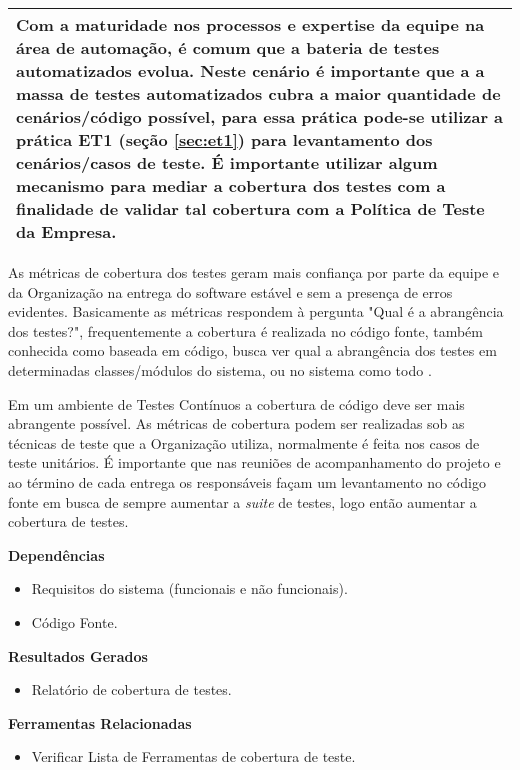 \begin{table}[H]
\centering
\begin{tabular}{|p{130mm}|}
\hline
Com a maturidade nos processos e expertise da equipe na área de automação, é comum que a bateria de testes automatizados evolua. Neste cenário é importante que a a massa de testes automatizados cubra a maior quantidade de cenários/código possível, para essa prática pode-se utilizar a prática ET1 (seção \ref{sec:et1}) para levantamento dos cenários/casos de teste.
É importante utilizar algum mecanismo para mediar a cobertura dos testes com a finalidade de validar tal cobertura com a Política de Teste da Empresa.\\ 
\hline
\end{tabular}
\end{table}

As métricas de cobertura dos testes geram mais confiança por parte da equipe e da Organização na entrega do software estável e sem a presença de erros evidentes. Basicamente as métricas respondem à pergunta "Qual é a abrangência dos testes?", frequentemente a cobertura é realizada no código fonte, também conhecida como baseada em código, busca ver qual a abrangência dos testes em determinadas classes/módulos do sistema, ou no sistema como todo \cite{RUP940320}.

Em um ambiente de Testes Contínuos a cobertura de código deve ser mais abrangente possível. As métricas de cobertura podem ser realizadas sob as técnicas de teste que a Organização utiliza, normalmente é feita nos casos de teste unitários. É importante que nas reuniões de acompanhamento do projeto e ao término de cada entrega os responsáveis façam um levantamento no código fonte em busca de sempre aumentar a \textit{suite} de testes, logo então aumentar a cobertura de testes.


\textbf{Dependências}
\begin{itemize}
    \item Requisitos do sistema (funcionais e não funcionais).
    \item Código Fonte.
\end{itemize}

\textbf{Resultados Gerados}
\begin{itemize}
    \item Relatório de cobertura de testes.

\end{itemize}

\textbf{Ferramentas Relacionadas}
\begin{itemize}
    \item Verificar Lista de Ferramentas de cobertura de teste.
\end{itemize}


